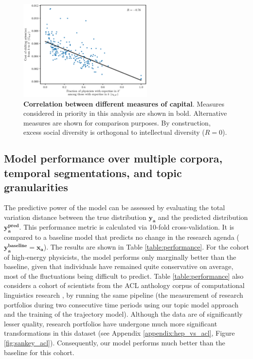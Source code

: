 \documentclass{article}
\begin{document}
\begin{figure}[h]
    \centering
    \includegraphics[width=0.6\textwidth]{Fig16}
    \caption{\textbf{Correlation between different measures of capital}. Measures considered in priority in this analysis are shown in bold. Alternative measures are shown for comparison purposes. By construction, excess social diversity is orthogonal to intellectual diversity ($R=0$). }
    \label{fig:capital_measures}
\end{figure}


\subsection{\label{appendix:model-performance}Model performance over multiple corpora, temporal segmentations, and topic granularities}

The predictive power of the model can be assessed by evaluating the total variation distance between the true distribution $\bm{y_a}$ and the predicted distribution $\bm{y_a^{\text{pred}}}$. This performance metric is calculated via 10-fold cross-validation. It is compared  to a baseline model that predicts no change in the research agenda ($\bm{y_a^{\text{baseline}}}=\bm{x_a}$). The results are shown in Table \ref{table:performance}. For the cohort of high-energy physicists, the model performs only marginally better than the baseline, given that individuals have remained quite conservative on average, most of the fluctuations being difficult to predict. Table \ref{table:performance} also considers a cohort of scientists from the ACL anthology corpus  of computational linguistics research \citep{acl_anthology_corpus}, by running the same pipeline (the measurement of research portfolios during two consecutive time periods using our topic model approach and the training of the trajectory model). Although the data are of significantly lesser quality, research portfolios have undergone much more significant transformations in this dataset (see Appendix \ref{appendix:hep_vs_acl}, Figure \ref{fig:sankey_acl}). Consequently, our model performs much better than the baseline for this cohort.
\end{document}
